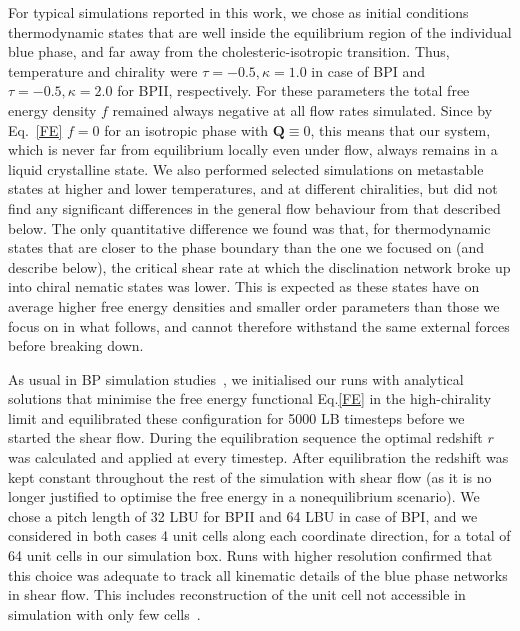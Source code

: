 \documentclass[8.5pt,twoside,twocolumn]{article}
\begin{document}
For typical simulations reported in this work, 
we chose as initial conditions thermodynamic states that are 
well inside the equilibrium region of the individual blue phase, and far away 
from the cholesteric-isotropic transition. Thus, temperature and chirality were 
$\tau=-0.5, \kappa=1.0$ in case of BPI and $\tau=-0.5, \kappa=2.0$ for BPII, respectively.
For these parameters the total free energy density $f$ remained always negative at all flow rates
simulated. 
Since by Eq.~\ref{FE} $f=0$ for an isotropic phase with ${\mathbf Q}\equiv 0$, 
this means that our system, which is never far from equilibrium locally even under flow, always remains in a liquid crystalline state. 
We also performed selected simulations on metastable states at higher and lower temperatures, 
and at different chiralities, but did not find any significant differences in the 
general flow behaviour from that described below.
The only quantitative difference we found was that, for thermodynamic states that are closer to the 
phase boundary than the one we focused on (and describe below), the critical shear
rate at which the disclination 
network broke up into chiral nematic states was lower. This is expected as these states have on average 
higher free energy densities and smaller order parameters than those we focus on in what follows, 
and cannot therefore withstand the same external forces before breaking down.

As usual in BP simulation studies~\cite{Henrich:2011a,Henrich:2010b}, we initialised our runs with 
analytical solutions that minimise the free energy functional Eq.\ref{FE} in the high-chirality limit 
and equilibrated these configuration for 5000 LB timesteps before we started the shear flow. 
During the equilibration sequence the optimal redshift $r$ was calculated and applied at every timestep.
After equilibration the redshift was kept constant throughout the rest of the simulation with shear flow (as 
it is no longer justified to optimise the free energy in a nonequilibrium scenario).
We chose a pitch length of 32 LBU for BPII and 64 LBU in case of BPI, and we considered in both cases 
4 unit cells along each coordinate direction, for a total of 64 unit cells in our simulation box.
Runs with higher resolution confirmed that this choice was adequate to track  
all kinematic details of the blue phase networks in shear flow. This includes
reconstruction of the unit cell not accessible in simulation with only
few cells~\cite{Dupuis:2005}.
\end{document}
